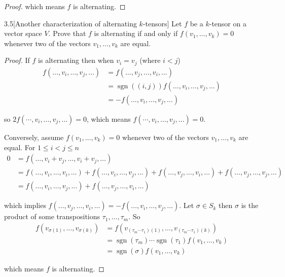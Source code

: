 \begin{proof}
	which means \( f \) is alternating.
\end{proof}

\begin{problem}{3.5}[Another characterization of alternating \( k \)-tensors]
Let \( f \) be a \( k \)-tensor on a vector space \( V \). Prove that \( f \) is alternating if and only if \( f(v_{1}, \ldots, v_{k}) = 0 \) whenever two of the vectors \( v_{1}, \ldots, v_{k} \) are equal.
\end{problem}

\begin{proof}
	If \( f \) is alternating then when \( v_{i} = v_{j} \) (where \( i < j \))
	\begingroup
	\allowdisplaybreaks%
	\begin{align*}
		f(\ldots, v_{i}, \ldots, v_{j}, \ldots) & = f(\ldots, v_{j}, \ldots, v_{i}, \ldots)                            \\
		                                        & = \operatorname{sgn}((i, j)) f(\ldots, v_{i}, \ldots, v_{j}, \ldots) \\
		                                        & = -f(\ldots, v_{i}, \ldots, v_{j}, \ldots)
	\end{align*}
	\endgroup

	so \( 2f(\cdots, v_{i}, \ldots, v_{j}, \ldots) = 0 \), which means \( f(\cdots, v_{i}, \ldots, v_{j}, \ldots) = 0 \).

	Conversely, assume \( f(v_{1}, \ldots, v_{k}) = 0 \) whenever two of the vectors \( v_{1}, \ldots, v_{k} \) are equal. For \( 1 \leq i < j \leq n \)
	\begingroup
	\allowdisplaybreaks%
	\begin{align*}
		0 & = f(\ldots, v_{i} + v_{j}, \ldots, v_{i} + v_{j}, \ldots)                                                                                                               \\
		  & = f(\ldots, v_{i}, \ldots, v_{i}, \ldots) + f(\ldots, v_{i}, \ldots, v_{j}, \ldots) + f(\ldots, v_{j}, \ldots, v_{i}, \ldots) + f(\ldots, v_{j}, \ldots, v_{j}, \ldots) \\
		  & = f(\ldots, v_{i}, \ldots, v_{j}, \ldots) + f(\ldots, v_{j}, \ldots, v_{i}, \ldots)
	\end{align*}
	\endgroup

	which implies \( f(\ldots, v_{j}, \ldots, v_{i}, \ldots) = -f(\ldots, v_{i}, \ldots, v_{j}, \ldots) \). Let \( \sigma \in S_{k} \) then \( \sigma \) is the product of some transpositions \( \tau_{1}, \ldots, \tau_{m} \). So
	\begingroup
	\allowdisplaybreaks%
	\begin{align*}
		f(v_{\sigma(1)}, \ldots, v_{\sigma(k)}) & = f(v_{(\tau_{m}\cdots\tau_{1})(1)}, \ldots, v_{(\tau_{m}\cdots\tau_{1})(k)})            \\
		                                        & = \operatorname{sgn}(\tau_{m})\cdots\operatorname{sgn}(\tau_{1}) f(v_{1}, \ldots, v_{k}) \\
		                                        & = \operatorname{sgn}(\sigma) f(v_{1}, \ldots, v_{k})
	\end{align*}
	\endgroup

	which means \( f \) is alternating.
\end{proof}

